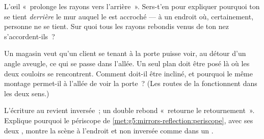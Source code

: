 \begin{exercise}[$\star\star$]\label{exo:g5:mirrors-reflection:9}
L'œil «~prolonge les rayons vers l'arrière~». Sers-t'en pour
expliquer pourquoi ton  se tient \emph{derrière} le mur auquel
le  est accroché --- à un endroit où, certainement, personne ne
se tient. Sur quoi tous les rayons rebondis venus de ton nez
s'accordent-ils~?
\end{exercise}

\begin{exercise}[$\star\star$]\label{exo:g5:mirrors-reflection:10}
Un magasin veut qu'un client se tenant à la porte puisse voir, au
détour d'un angle aveugle, ce qui se passe dans l'allée. Un seul
 plan doit être posé là où les deux couloirs se rencontrent.
Comment doit-il être incliné, et pourquoi le même montage permet-il à
l'allée de voir la porte~? (Les routes de la  fonctionnent
dans les deux sens.)
\end{exercise}

\begin{exercise}[$\star\star$]\label{exo:g5:mirrors-reflection:11}
L'écriture au  revient inversée~; un double rebond «~retourne
le retournement~». Explique pourquoi le périscope de
\cref{met:g5:mirrors-reflection:periscope}, avec ses deux ,
montre la scène à l'endroit et non inversée comme dans un .
\end{exercise}
